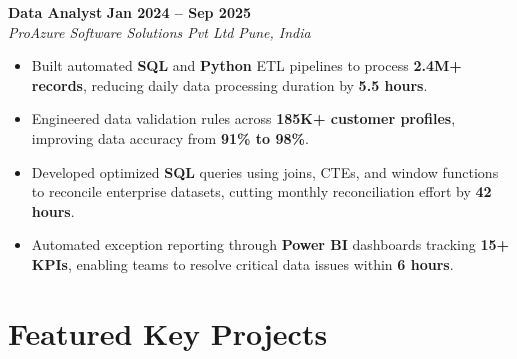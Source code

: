 \documentclass[a4paper,10pt]{article}
\begin{document}
\vspace{5pt}

\textbf{Data Analyst} \hfill \textbf{Jan 2024 -- Sep 2025} \\
\textit{ProAzure Software Solutions Pvt Ltd} \hfill \textit{Pune, India}
\begin{itemize}
    \item Built automated \textbf{SQL} and \textbf{Python} ETL pipelines to process \textbf{2.4M+ records}, reducing daily data processing duration by \textbf{5.5 hours}.
    \item Engineered data validation rules across \textbf{185K+ customer profiles}, improving data accuracy from \textbf{91\% to 98\%}.
    \item Developed optimized \textbf{SQL} queries using joins, CTEs, and window functions to reconcile enterprise datasets, cutting monthly reconciliation effort by \textbf{42 hours}.
    \item Automated exception reporting through \textbf{Power BI} dashboards tracking \textbf{15+ KPIs}, enabling teams to resolve critical data issues within \textbf{6 hours}.
\end{itemize}

\vspace{4pt}

\section{Featured Key Projects}
\end{document}
